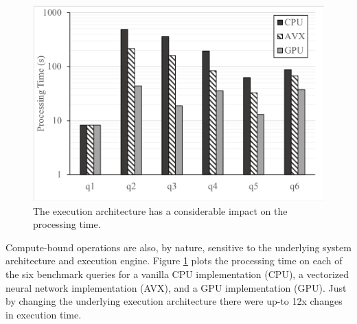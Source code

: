 \begin{figure}[t]
\centering
 \includegraphics[width=\columnwidth]{figures/build.png}
 \caption{The execution architecture has a considerable impact on the processing time.  \label{build} }
\end{figure}

Compute-bound operations are also, by nature, sensitive to the underlying system architecture and execution engine. Figure \ref{build} plots the processing time on each of the six benchmark queries for a vanilla CPU implementation (CPU), a vectorized neural network implementation (AVX), and a GPU implementation (GPU). Just by changing the underlying execution architecture there were up-to 12x changes in execution time. 


